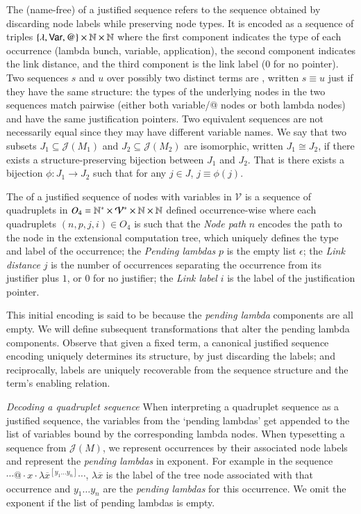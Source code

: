 \documentclass{elsarticle}
\theoremstyle{plain}
\theoremstyle{definition}
\theoremstyle{remark}
\newcommand\VarSet{\mathcal{V}}
\def\justseqset{\mathcal{J}}
\begin{document}
The (name-free)  of a justified sequence refers to the sequence obtained by discarding node labels while preserving node types. It is encoded as a sequence of triples $\{\lambda, {\sf Var}, @ \}\times\mathbb{N}\times\mathbb{N}$ where the first component indicates the type of each occurrence (lambda bunch, variable, application), the second component indicates the link distance, and the third component is the link label ($0$ for no pointer).
Two sequences $s$ and $u$ over possibly two distinct terms are , written $s \equiv u$ just if they have the same structure: the types of the underlying nodes in the two sequences match pairwise (either both variable/@ nodes or both lambda nodes) and have the same justification pointers. Two equivalent sequences are not necessarily equal since they may have different variable names.
We say that two subsets $J_1\subseteq \justseqset(M_1)$ and $J_2\subseteq\justseqset(M_2)$ are isomorphic, written $J_1\cong J_2$, if  there exists a structure-preserving bijection between $J_1$ and $J_2$. That is there exists a bijection $\phi :J_1\longrightarrow J_2$ such that for any $j\in J$, $j\equiv\phi(j)$.

The  of a justified sequence of nodes with variables in $\VarSet$ is a sequence of quadruplets in $O_4 = \mathbb{N}^*\times \mathcal{V}^* \times\mathbb{N}\times\mathbb{N}$ defined occurrence-wise where each quadruplets $(n,p,j,i) \in O_4$ is such that the \emph{Node path} $n$ encodes the path to the node in the extensional computation tree, which uniquely defines the type and label of the occurrence;
the \emph{Pending lambdas} $p$ is the empty list $\epsilon$;
the \emph{Link distance} $j$ is the number of occurrences separating the occurrence from its justifier plus $1$, or $0$ for no justifier;
the \emph{Link label} $i$ is the label of the justification pointer.

This initial encoding is said to be  because the \emph{pending lambda} components are all empty. We will define subsequent transformations that alter the pending lambda components.
Observe that given a fixed term, a canonical justified sequence encoding uniquely determines its structure, by just discarding the labels; and reciprocally, labels are uniquely recoverable from the sequence structure and the term's enabling relation.

\emph{Decoding a quadruplet sequence} When interpreting a quadruplet sequence as a justified sequence, the variables from the `pending lambdas' get appended to the list of variables bound by the corresponding lambda nodes. When typesetting a sequence from $\justseqset(M)$, we represent occurrences by their associated node labels and represent the \emph{pending lambdas} in exponent. For example in the sequence $\cdots @ \cdot x \cdot \lambda\overline{x}^{[y_1 \ldots y_n]} \cdots$, $\lambda\overline{x}$ is the label of the tree node associated with that occurrence and $y_1 \ldots y_n$ are the \emph{pending lambdas} for this occurrence. We omit the exponent if the list of pending lambdas is empty.
\end{document}
